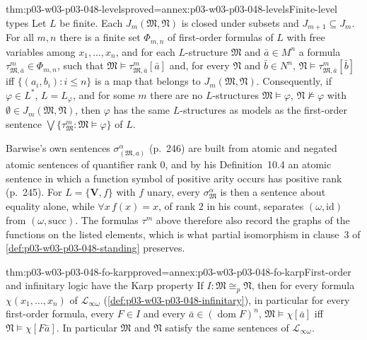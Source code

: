 \begin{hblemma}{thm:p03-w03-p03-048-levels}{proved=annex:p03-w03-p03-048-levels}{Finite-level types}
Let \(L\) be finite.  Each \(J_m(\mathfrak M,\mathfrak N)\) is closed under
subsets and \(J_{m+1}\subseteq J_m\).  For all \(m,n\) there is a finite set
\(\Phi_{m,n}\) of first-order formulas of \(L\) with free variables among
\(x_1,\ldots,x_n\), and for each \(L\)-structure \(\mathfrak M\) and
\(\bar a\in M^{n}\) a formula \(\tau^{m}_{\mathfrak M,\bar a}\in\Phi_{m,n}\),
such that \(\mathfrak M\models\tau^{m}_{\mathfrak M,\bar a}[\bar a]\) and, for
every \(\mathfrak N\) and \(\bar b\in N^{n}\),
\(\mathfrak N\models\tau^{m}_{\mathfrak M,\bar a}[\bar b]\) iff
\(\{(a_i,b_i):i\leq n\}\) is a map that belongs to
\(J_m(\mathfrak M,\mathfrak N)\).  Consequently, if \(\varphi\in L^{\ast}\),
\(L=L_\varphi\), and for some \(m\) there are no \(L\)-structures
\(\mathfrak M\models\varphi\), \(\mathfrak N\not\models\varphi\) with
\(\emptyset\in J_m(\mathfrak M,\mathfrak N)\), then \(\varphi\) has the same
\(L\)-structures as models as the first-order sentence
\(\bigvee\{\tau^{m}_{\mathfrak M}:\mathfrak M\models\varphi\}\) of \(L\).
\end{hblemma}

Barwise's own sentences \(\sigma^{\alpha}_{(\mathfrak M,a)}\) (p.~246) are
built from atomic and negated atomic sentences of quantifier rank \(0\), and
by his Definition~10.4 an atomic sentence in which a function symbol of
positive arity occurs has positive rank (p.~245).  For \(L=\{\mathbf V,f\}\)
with \(f\) unary, every \(\sigma^{\alpha}_{\mathfrak M}\) is then a sentence
about equality alone, while \(\forall x\,f(x)=x\), of rank \(2\) in his
count, separates \((\omega,\mathrm{id})\) from \((\omega,\mathrm{succ})\).
The formulas \(\tau^{m}\) above therefore also record the graphs of the
functions on the listed elements, which is what partial isomorphism in
clause~3 of \cref{def:p03-w03-p03-048-standing} preserves.

\begin{hblemma}{thm:p03-w03-p03-048-fo-karp}{proved=annex:p03-w03-p03-048-fo-karp}{First-order and infinitary logic have the Karp property}
If \(I:\mathfrak M\cong_{p}\mathfrak N\), then for every formula
\(\chi(x_1,\ldots,x_n)\) of \(\mathcal L_{\infty\omega}\)
(\cref{def:p03-w03-p03-048-infinitary}), in particular for every first-order
formula, every \(F\in I\) and every
\(\bar a\in(\operatorname{dom}F)^{n}\),
\(\mathfrak M\models\chi[\bar a]\) iff \(\mathfrak N\models\chi[F\bar a]\).
In particular \(\mathfrak M\) and \(\mathfrak N\) satisfy the same
sentences of \(\mathcal L_{\infty\omega}\).
\end{hblemma}


